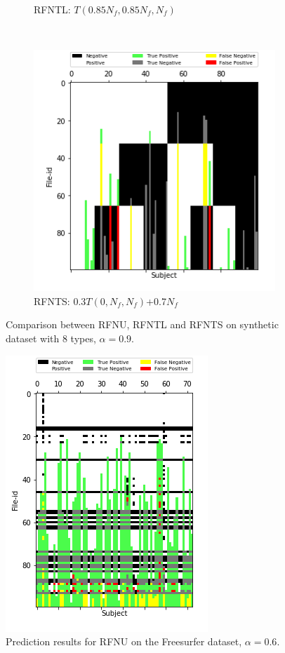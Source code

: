 \documentclass[10pt, conference, compsocconf]{IEEEtran}
\begin{document}
\begin{figure}
\begin{subfigure}[b]{0.4\columnwidth}
        \caption{RFNTL: $T(0.85N_f, 0.85N_f, N_f)$}
        \label{fig:overlap-rfntl}
\end{subfigure}\\
\begin{subfigure}[b]{0.4\columnwidth}
        \includegraphics[width=\columnwidth]{figures/RFNT-S_Syn_8_ALS_09_test_data_matrix_run1.png}
        \caption{RFNTS: 0.3$T(0, N_f, N_f)$+0.7$N_f$}
        \label{fig:overlap-rfnts}
\end{subfigure}
\caption{Comparison between RFNU, RFNTL and RFNTS on synthetic dataset with 8 types, $\alpha=0.9$.}
\label{fig:overlap}
\end{figure}

\begin{figure}
\centering
\includegraphics[width=0.6\columnwidth]{figures/RFNU_FS100F_ALS_06_test_data_matrix_run1.png}
\caption{Prediction results for RFNU on the Freesurfer dataset, $\alpha=0.6$.}
\label{fig:error-locality}
\end{figure}
\end{document}
